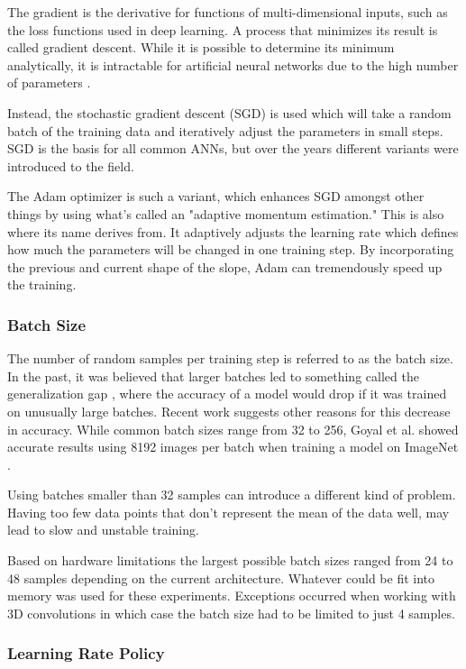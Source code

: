 The gradient is the derivative for functions of multi-dimensional inputs, such as the loss functions used in deep learning. A process that minimizes its result is called gradient descent. While it is possible to determine its minimum analytically, it is intractable for artificial neural networks due to the high number of parameters \cite{Chollet2017}.

Instead, the stochastic gradient descent (SGD) is used which will take a random batch of the training data and iteratively adjust the parameters in small steps. SGD is the basis for all common ANNs, but over the years different variants were introduced to the field.

The Adam optimizer \cite{Kingma2014} is such a variant, which enhances SGD amongst other things by using what's called an "adaptive momentum estimation." This is also where its name derives from. It adaptively adjusts the learning rate which defines how much the parameters will be changed in one training step. By incorporating the previous and current shape of the slope, Adam can tremendously speed up the training.

\subsubsection{Batch Size}

The number of random samples per training step is referred to as the batch size. In the past, it was believed that larger batches led to something called the generalization gap \cite{Keskar2016}, where the accuracy of a model would drop if it was trained on unusually large batches. Recent work \cite{Hoffer2017} suggests other reasons for this decrease in accuracy. While common batch sizes range from 32 to 256, Goyal et al. showed accurate results using 8192 images per batch when training a model on ImageNet \cite{Goyal2017}.

Using batches smaller than 32 samples can introduce a different kind of problem. Having too few data points that don't represent the mean of the data well, may lead to slow and unstable training.

Based on hardware limitations the largest possible batch sizes ranged from 24 to 48 samples depending on the current architecture. Whatever could be fit into memory was used for these experiments. Exceptions occurred when working with 3D convolutions in which case the batch size had to be limited to just 4 samples.

\subsubsection{Learning Rate Policy}

